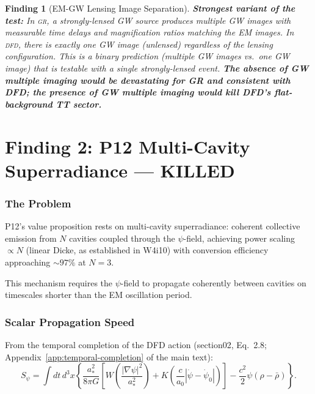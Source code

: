 \documentclass[11pt]{article}
\newtheorem{finding}{Finding}
\newcommand{\DFD}{\textsc{dfd}}
\newcommand{\GR}{\textsc{gr}}
\begin{document}
\begin{finding}[EM-GW Lensing Image Separation]
\textbf{Strongest variant of the test:} In \GR, a strongly-lensed
GW source produces multiple GW images with measurable time delays
and magnification ratios matching the EM images. In \DFD, there is
exactly \emph{one} GW image (unlensed) regardless of the lensing
configuration. This is a binary prediction (multiple GW images vs.\
one GW image) that is testable with a \emph{single} strongly-lensed
event. \textbf{The absence of GW multiple imaging would be devastating
for GR and consistent with DFD; the presence of GW multiple imaging
would kill DFD's flat-background TT sector.}
\end{finding}


\part{Finding 2: P12 Multi-Cavity Superradiance --- KILLED}
\label{part:P12-killed}

\section{The Problem}

P12's value proposition rests on multi-cavity superradiance: coherent
collective emission from $N$ cavities coupled through the $\psi$-field,
achieving power scaling $\propto N$ (linear Dicke, as established in
W4i10) with conversion efficiency approaching $\sim 97\%$ at $N = 3$.

This mechanism requires the $\psi$-field to propagate coherently between
cavities on timescales shorter than the EM oscillation period.

\section{Scalar Propagation Speed}

From the temporal completion of the DFD action (section02, Eq.~2.8;
Appendix~\ref{app:temporal-completion} of the main text):
\begin{equation}
S_\psi = \int dt\,d^3x\left\{
\frac{a_*^2}{8\pi G}\left[
  W\!\left(\frac{|\nabla\psi|^2}{a_*^2}\right)
  + K\!\left(\frac{c}{a_0}|\dot\psi - \dot\psi_0|\right)
\right]
- \frac{c^2}{2}\psi(\rho - \bar{\rho})
\right\}.
\end{equation}
\end{document}
